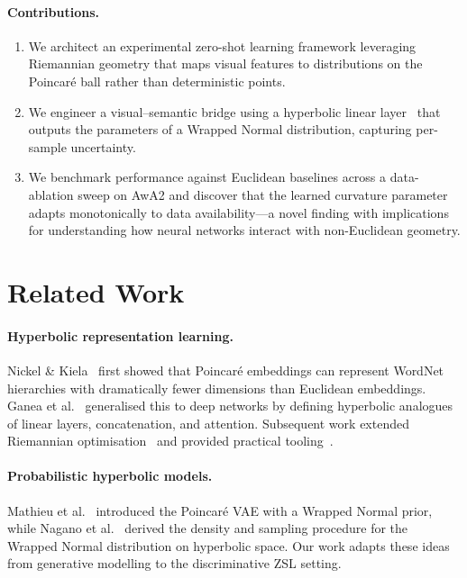 \documentclass{article}
\begin{document}
\paragraph{Contributions.}
\begin{enumerate}
    \item We architect an experimental zero-shot learning framework leveraging Riemannian geometry that maps visual features to distributions on the Poincar\'{e} ball rather than deterministic points.
    \item We engineer a visual--semantic bridge using a hyperbolic linear layer~\cite{ganea2018hyperbolic} that outputs the parameters of a Wrapped Normal distribution, capturing per-sample uncertainty.
    \item We benchmark performance against Euclidean baselines across a data-ablation sweep on AwA2 and discover that the learned curvature parameter adapts monotonically to data availability---a novel finding with implications for understanding how neural networks interact with non-Euclidean geometry.
\end{enumerate}

\section{Related Work}\label{sec:related}

\paragraph{Hyperbolic representation learning.}
Nickel \& Kiela~\cite{nickel2017poincare} first showed that Poincar\'{e} embeddings can represent WordNet hierarchies with dramatically fewer dimensions than Euclidean embeddings.
Ganea et al.~\cite{ganea2018hyperbolic} generalised this to deep networks by defining hyperbolic analogues of linear layers, concatenation, and attention.
Subsequent work extended Riemannian optimisation~\cite{becigneul2019riemannian} and provided practical tooling~\cite{kochurov2020geoopt}.

\paragraph{Probabilistic hyperbolic models.}
Mathieu et al.~\cite{mathieu2019continuous} introduced the Poincar\'{e} VAE with a Wrapped Normal prior, while Nagano et al.~\cite{nagano2019wrapped} derived the density and sampling procedure for the Wrapped Normal distribution on hyperbolic space.
Our work adapts these ideas from generative modelling to the discriminative ZSL setting.
\end{document}
